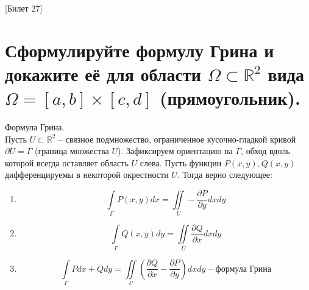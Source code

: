 [Билет 27]

\section{Сформулируйте формулу Грина и докажите её для области $\Omega \subset \mathbb{R}^2$ вида $\Omega = [a, b] \times [c, d]$ (прямоугольник).}

\begin{theorem}{Формула Грина.}\\
    Пусть $U \subset \mathbb{R}^2$ -- связное подмножество, ограниченное кусочно-гладкой кривой $\partial U = \Gamma$ (граница множества $U$).
    Зафиксируем ориентацию на $\Gamma$, обход вдоль которой всегда оставляет область $U$ слева. Пусть функции $P(x, y), Q(x, y)$ дифференцируемы
    в некоторой окрестности $U$. Тогда верно следующее:
    \begin{enumerate}
        \item \[ \int\limits_{\Gamma} P(x, y)dx = \iint\limits_{U} -\frac{\partial P}{\partial y}dxdy \]
        \item \[ \int\limits_{\Gamma} Q(x, y)dy = \iint\limits_{U} \frac{\partial Q}{\partial x}dxdy \]
        \item \[ \int\limits_{\Gamma} Pdx + Qdy =
                \iint\limits_{U} \left(\frac{\partial Q}{\partial x} - \frac{\partial P}{\partial y}\right)dxdy \text{ -- формула Грина}\]
    \end{enumerate}
\end{theorem}

